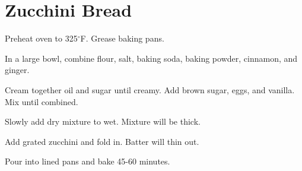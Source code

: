 \section{Zucchini Bread}
\begin{recipe}




	Preheat oven to 325$^{\circ}$F. Grease baking pans.

	In a large bowl, combine flour, salt, baking soda, baking powder, cinnamon, and ginger.

	Cream together oil and sugar until creamy. Add brown sugar, eggs, and vanilla. Mix until combined.

	Slowly add dry mixture to wet. Mixture will be thick.

	Add grated zucchini and fold in. Batter will thin out.

	Pour into lined pans and bake 45-60 minutes.



\end{recipe}
